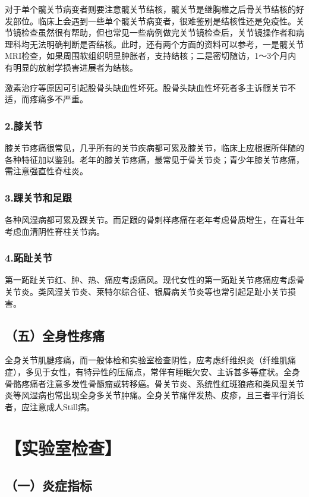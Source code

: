对于单个髋关节病变者则要注意髋关节结核，髋关节是继胸椎之后骨关节结核的好发部位。临床上会遇到一些单个髋关节病变者，很难鉴别是结核性还是免疫性。关节镜检查虽然很有帮助，但也常见一些病例做完关节镜检查后，关节镜操作者和病理科均无法明确判断是否结核。此时，还有两个方面的资料可以参考，一是髋关节MRI检查，如果周围软组织明显肿胀者，支持结核；二是密切随访，1～3个月内有明显的放射学损害进展者为结核。

激素治疗等原因可引起股骨头缺血性坏死。股骨头缺血性坏死者多主诉髋关节不适，而疼痛多不严重。

\subsubsection{2.膝关节}

膝关节疼痛很常见，几乎所有的关节疾病都可累及膝关节，临床上应根据所伴随的各种特征加以鉴别。老年的膝关节疼痛，最常见于骨关节炎；青少年膝关节疼痛，需注意强直性脊柱炎。

\subsubsection{3.踝关节和足跟}

各种风湿病都可累及踝关节。而足跟的骨刺样疼痛在老年考虑骨质增生，在青壮年考虑血清阴性脊柱关节病。

\subsubsection{4.跖趾关节}

第一跖趾关节红、肿、热、痛应考虑痛风。现代女性的第一跖趾关节疼痛应考虑骨关节炎。类风湿关节炎、莱特尔综合征、银屑病关节炎等也常引起足趾小关节损害。

\subsection{（五）全身性疼痛}

全身关节肌腱疼痛，而一般体检和实验室检查阴性，应考虑纤维织炎（纤维肌痛症），多见于女性，有特异性的压痛点，常伴有睡眠欠安、主诉甚多等症状。全身骨骼疼痛者注意多发性骨髓瘤或转移癌。骨关节炎、系统性红斑狼疮和类风湿关节炎等风湿病也常出现全身多关节肿痛。全身关节痛伴发热、皮疹，且三者平行消长者，应注意成人Still病。

\section{【实验室检查】}

\subsection{（一）炎症指标}

